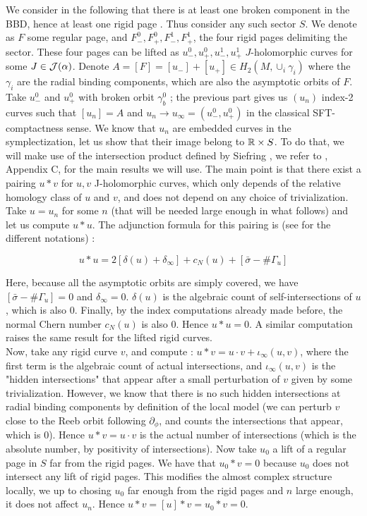 \documentclass[../main.tex]{subfiles}
\begin{document}
We consider in the following that there is at least one broken component in the BBD, hence at least one rigid page . Thus consider any such sector $S$. We denote as $F$ some regular page, and $F_-^0, F_+^0,F_-^1,F_+^1$, the four rigid pages delimiting the sector. These four pages can be lifted as  $u_-^0, u_+^0,u_-^1,u_+^1$
$J$-holomorphic curves for some $J\in \mathcal{J}(\alpha)$. Denote $A = [F] = [u_-] + [u_+] \in H_2(M,\cup_i\gamma_i)$ where the $\gamma_i$ are the radial binding components, which are also the asymptotic orbits of $F$. \\
    
Take $u_-^0$ and $u_+^0$ with broken orbit $\gamma_b^0$ ; the previous part gives us $(u_n)$ index-2 curves such that $[u_n] = A$ and $u_n\rightarrow u_\infty = (u_-^0,u_+^0)$ in the classical SFT-comptactness sense. We know that $u_n$ are embedded curves in the symplectization, let us show that their image belong to $\mathbb{R}\times S$. To do that, we will make use of the intersection product defined by Siefring \cite{siefring_intersection_2011}, we refer to \cite{wendl_contact_2019}, Appendix C, for the main results we will use. The main point is that there exist a pairing $u*v$ for $u,v$ J-holomorphic curves, which only depends of the relative homology class of $u$ and $v$, and does not depend on any choice of trivialization. \\

Take $u = u_n$ for some $n$ (that will be needed large enough in what follows) and let us compute $u*u$. The adjunction formula for this pairing is (see \cite{wendl_contact_2019} for the different notations) :

$$u*u = 2[\delta(u) + \delta_\infty] + c_N(u) + [\bar{\sigma}- \#\Gamma_u]$$

Here, because all the asymptotic orbits are simply covered, we have $[\bar{\sigma}- \#\Gamma_u] = 0$ and $\delta_\infty = 0$. $\delta(u)$ is the algebraic count of self-intersections of $u$, which is also $0$. Finally, by the index computations already made before, the normal Chern number $c_N(u)$ is also $0$. Hence $u*u = 0$. A similar computation raises the same result for the lifted rigid curves. \\

Now, take any rigid curve $v$, and compute : $u*v = u\cdot v + \iota_\infty(u,v)$, where the first term is the algebraic count of actual intersections, and $\iota_\infty(u,v)$ is the "hidden intersections" that appear after a small perturbation of $v$ given by some trivialization. However, we know that there is no such hidden intersections at radial binding components by definition of the local model (we can perturb $v$ close to the Reeb orbit following $\partial_\phi$, and counts the intersections that appear, which is $0$). Hence $u*v = u\cdot v$ is the actual number of intersections (which is the absolute number, by positivity of intersections). Now take $u_0$ a lift of a regular page in $S$ far from the rigid pages. We have that $u_0*v = 0$ because $u_0$ does not intersect any lift of rigid pages. This modifies the almost complex structure locally, we up to chosing $u_0$ far enough from the rigid pages and $n$ large enough, it does not affect $u_n$. Hence $u*v = [u]*v = u_0*v = 0$. \\
\end{document}
